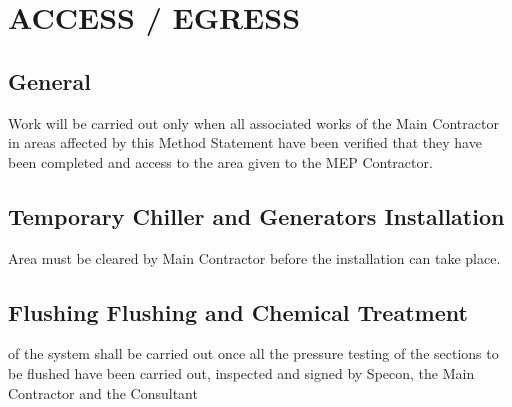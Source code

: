 \section{ACCESS / EGRESS}

\subsection{General}
    Work will be carried out only when all associated works of the Main Contractor in areas affected by this Method Statement     have been verified that they have been completed and access to the area given to the MEP Contractor.
\subsection{Temporary Chiller and Generators Installation}
  Area must be cleared by Main Contractor before the installation can take place.
\subsection{Flushing  Flushing and Chemical Treatment}
 of the system shall be carried out once all the pressure testing of the sections to be flushed have been carried out, inspected and signed by Specon, the Main Contractor and the Consultant
